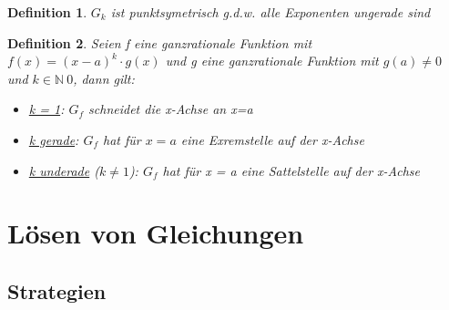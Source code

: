 \documentclass{book}
\newtheorem{definition}{Definition}
\begin{document}
\begin{definition}
    $G_k$ ist punktsymetrisch g.d.w. alle Exponenten ungerade sind
\end{definition}

\begin{definition}
    Seien f eine ganzrationale Funktion mit $f(x) = (x-a)^k \cdot g(x)$ und g eine ganzrationale Funktion mit $g(a) \not = 0$ 
    und $k \in \mathbb{N} \ {0}$, dann gilt:
    \begin{itemize}
        \item \underline{k = 1}: $G_f$ schneidet die x-Achse an x=a
        \item \underline{k gerade}: $G_f$ hat für $x=a$ eine Exremstelle auf der x-Achse
        \item \underline{k underade} ($k \not = 1$): $G_f $ hat für x = a eine Sattelstelle auf der x-Achse
    \end{itemize}
\end{definition}

\chapter {Lösen von Gleichungen}

\section{Strategien}
\end{document}
